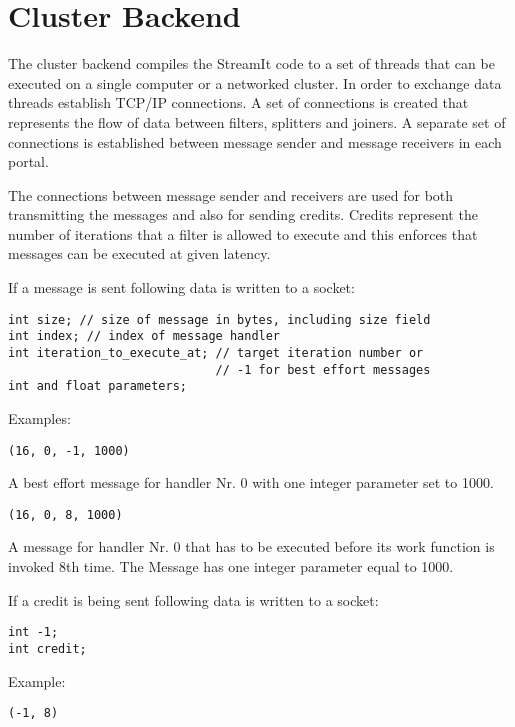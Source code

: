 \section{Cluster Backend}

The cluster backend compiles the StreamIt code to a set of threads
that can be executed on a single computer or a networked cluster. In
order to exchange data threads establish TCP/IP connections. A set of
connections is created that represents the flow of data between
filters, splitters and joiners. A separate set of connections is
established between message sender and message receivers in each
portal.

The connections between message sender and receivers are used for both
transmitting the messages and also for sending credits. Credits
represent the number of iterations that a filter is allowed to execute
and this enforces that messages can be executed at given latency.

If a message is sent following data is written to a socket:

{\scriptsize
\begin{verbatim}
int size; // size of message in bytes, including size field
int index; // index of message handler
int iteration_to_execute_at; // target iteration number or
                             // -1 for best effort messages 
int and float parameters;
\end{verbatim}}

Examples:

{\scriptsize
\begin{verbatim}
(16, 0, -1, 1000)
\end{verbatim}}

A best effort message for handler Nr. 0 with one integer parameter set
to 1000.

{\scriptsize
\begin{verbatim}
(16, 0, 8, 1000)
\end{verbatim}}

A message for handler Nr. 0 that has to be executed before its work
function is invoked 8th time. The Message has one integer parameter equal
to 1000.

If a credit is being sent following data is written to a socket:

{\scriptsize
\begin{verbatim}
int -1; 
int credit; 
\end{verbatim}}

Example:


{\scriptsize
\begin{verbatim}
(-1, 8)
\end{verbatim}}

